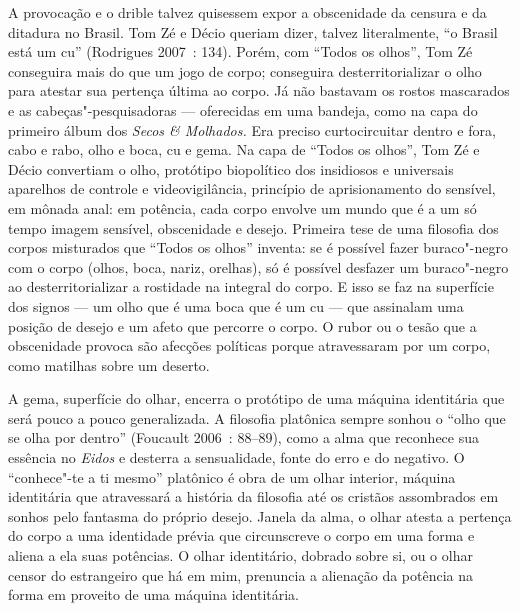 A provocação e o drible talvez quisessem expor a obscenidade da censura
e da ditadura no Brasil. Tom Zé e Décio queriam dizer, talvez
literalmente, ``o Brasil está um cu'' (Rodrigues 2007~: 134). Porém, com
``Todos os olhos'', Tom Zé conseguira mais do que um jogo de
corpo; conseguira desterritorializar o olho para atestar sua pertença
última ao corpo. Já não bastavam os rostos mascarados e as
cabeças"-pesquisadoras --- oferecidas em uma bandeja, como na capa do
primeiro álbum dos \emph{Secos \& Molhados.} Era preciso curtocircuitar
dentro e fora, cabo e rabo, olho e boca, cu e gema. Na capa de ``Todos
os olhos'', Tom Zé e Décio convertiam o olho, protótipo biopolítico dos
insidiosos e universais aparelhos de controle e videovigilância,
princípio de aprisionamento do sensível, em mônada anal: em potência,
cada corpo envolve um mundo que é a um só tempo imagem sensível,
obscenidade e desejo. Primeira tese de uma filosofia dos corpos
misturados que ``Todos os olhos'' inventa: se é possível fazer
buraco"-negro com o corpo (olhos, boca, nariz, orelhas), só é possível
desfazer um buraco"-negro ao desterritorializar a rostidade na integral
do corpo. E isso se faz na superfície dos signos --- um olho que é uma
boca que é um cu --- que assinalam uma posição de desejo e um afeto que
percorre o corpo. O rubor ou o tesão que a obscenidade provoca são
afecções políticas porque atravessaram por um corpo, como matilhas sobre
um deserto.

A gema, superfície do olhar, encerra o protótipo de uma máquina
identitária que será pouco a pouco generalizada. A filosofia platônica
sempre sonhou o ``olho que se olha por dentro'' (Foucault 2006~: 88--89),
como a alma que reconhece sua essência no \emph{Eidos} e desterra a
sensualidade, fonte do erro e do negativo. O ``conhece"-te a ti mesmo''
platônico é obra de um olhar interior, máquina identitária que
atravessará a história da filosofia até os cristãos assombrados em
sonhos pelo fantasma do próprio desejo. Janela da alma, o olhar atesta a
pertença do corpo a uma identidade prévia que circunscreve o corpo em
uma forma e aliena a ela suas potências. O olhar identitário, dobrado
sobre si, ou o olhar censor do estrangeiro que há em mim, prenuncia a
alienação da potência na forma em proveito de uma máquina identitária.

